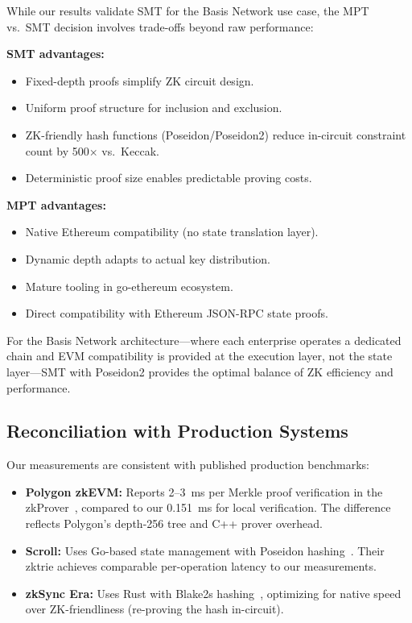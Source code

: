 While our results validate SMT for the Basis Network use case, the
MPT vs.\ SMT decision involves trade-offs beyond raw performance:

\textbf{SMT advantages:}
\begin{itemize}
  \item Fixed-depth proofs simplify ZK circuit design.
  \item Uniform proof structure for inclusion and exclusion.
  \item ZK-friendly hash functions (Poseidon/Poseidon2) reduce
    in-circuit constraint count by 500$\times$ vs.\ Keccak.
  \item Deterministic proof size enables predictable proving costs.
\end{itemize}

\textbf{MPT advantages:}
\begin{itemize}
  \item Native Ethereum compatibility (no state translation layer).
  \item Dynamic depth adapts to actual key distribution.
  \item Mature tooling in go-ethereum ecosystem.
  \item Direct compatibility with Ethereum JSON-RPC state proofs.
\end{itemize}

For the Basis Network architecture---where each enterprise operates
a dedicated chain and EVM compatibility is provided at the execution
layer, not the state layer---SMT with Poseidon2 provides the optimal
balance of ZK efficiency and performance.

\subsection{Reconciliation with Production Systems}

Our measurements are consistent with published production benchmarks:

\begin{itemize}
  \item \textbf{Polygon zkEVM:} Reports 2--3~ms per Merkle proof
    verification in the zkProver~\cite{polygon2024zkprover}, compared
    to our 0.151~ms for local verification. The difference reflects
    Polygon's depth-256 tree and C++ prover overhead.
  \item \textbf{Scroll:} Uses Go-based state management with Poseidon
    hashing~\cite{scroll2024architecture}. Their zktrie achieves
    comparable per-operation latency to our measurements.
  \item \textbf{zkSync Era:} Uses Rust with Blake2s
    hashing~\cite{zksync2024boojum}, optimizing for native speed
    over ZK-friendliness (re-proving the hash in-circuit).
\end{itemize}

